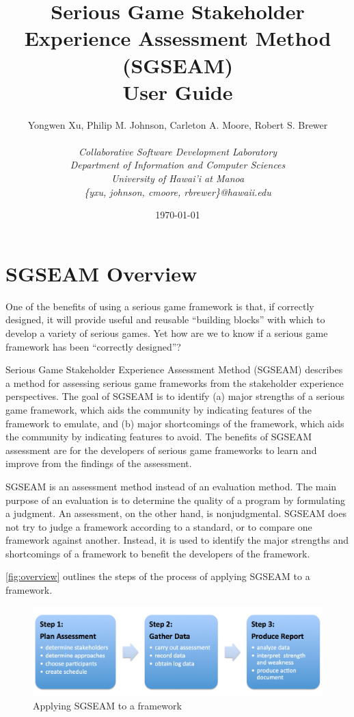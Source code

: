 \documentclass[11pt,oneside]{book}
\title{\textbf{Serious Game Stakeholder Experience Assessment Method (SGSEAM) \\
User Guide}}
\author{Yongwen Xu, Philip M. Johnson, Carleton A. Moore, Robert S. Brewer\\
\\
\em  Collaborative Software Development Laboratory \\
\em  Department of Information and Computer Sciences \\
\em  University of Hawai'i at Manoa\\
     \{yxu, johnson, cmoore, rbrewer\}@hawaii.edu}
\date{\today}
\begin{document}
  \maketitle
  \thispagestyle{empty}
  \tableofcontents
  \newpage
  
\chapter{SGSEAM Overview}
One of the benefits of using a serious game framework is that, if correctly designed, it will 
provide useful and reusable ``building blocks'' with which to develop a variety of serious 
games. Yet how are we to know if a serious game framework has been ``correctly designed''?

Serious Game Stakeholder Experience Assessment Method (SGSEAM) describes a method for 
assessing serious game frameworks from the stakeholder 
experience perspectives.  The goal of SGSEAM is to identify (a) major strengths of a serious game
framework, which aids the community by indicating features of the framework to emulate, and
(b) major shortcomings of the framework, which aids the community by indicating features to avoid.
The benefits of SGSEAM assessment are for the developers of serious game frameworks 
to learn and improve from the findings of the assessment.

SGSEAM is an assessment method instead of an evaluation method. The main purpose 
of an evaluation is to determine the quality of a program by formulating a judgment. An assessment, on 
the other hand, is nonjudgmental. SGSEAM does not try to judge a framework according to a 
standard, or to compare one framework against another. Instead, it is used to identify the major 
strengths and shortcomings of a framework to benefit  the developers of the framework.

\autoref{fig:overview} outlines the steps of the process of applying SGSEAM to a framework.

\begin{figure}[ht!]
  \center
  \includegraphics[width=0.8\columnwidth]{sgseam-steps}
  \caption{Applying SGSEAM to a framework}
  \label{fig:overview}
\end{figure}
\end{document}
